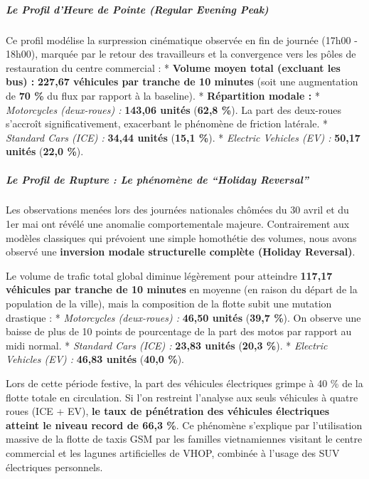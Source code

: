 \documentclass[11pt, a4paper]{article}
\begin{document}
\subparagraph{Le Profil d'Heure de Pointe (Regular Evening
Peak)}\label{le-profil-dheure-de-pointe-regular-evening-peak}

Ce profil modélise la surpression cinématique observée en fin de journée
(17h00 - 18h00), marquée par le retour des travailleurs et la
convergence vers les pôles de restauration du centre commercial : *
\textbf{Volume moyen total (excluant les bus) :} \textbf{227,67
véhicules par tranche de 10 minutes} (soit une augmentation de
\textbf{70 \%} du flux par rapport à la baseline). * \textbf{Répartition
modale :} * \emph{Motorcycles (deux-roues) :} \textbf{143,06 unités}
(\textbf{62,8 \%}). La part des deux-roues s'accroît significativement,
exacerbant le phénomène de friction latérale. * \emph{Standard Cars
(ICE) :} \textbf{34,44 unités} (\textbf{15,1 \%}). * \emph{Electric
Vehicles (EV) :} \textbf{50,17 unités} (\textbf{22,0 \%}).

\subparagraph{Le Profil de Rupture : Le phénomène de ``Holiday
Reversal''}\label{le-profil-de-rupture-le-phuxe9nomuxe8ne-de-holiday-reversal}

Les observations menées lors des journées nationales chômées du 30 avril
et du 1er mai ont révélé une anomalie comportementale majeure.
Contrairement aux modèles classiques qui prévoient une simple homothétie
des volumes, nous avons observé une \textbf{inversion modale
structurelle complète (Holiday Reversal)}.

Le volume de trafic total global diminue légèrement pour atteindre
\textbf{117,17 véhicules par tranche de 10 minutes} en moyenne (en
raison du départ de la population de la ville), mais la composition de
la flotte subit une mutation drastique : * \emph{Motorcycles
(deux-roues) :} \textbf{46,50 unités} (\textbf{39,7 \%}). On observe une
baisse de plus de 10 points de pourcentage de la part des motos par
rapport au midi normal. * \emph{Standard Cars (ICE) :} \textbf{23,83
unités} (\textbf{20,3 \%}). * \emph{Electric Vehicles (EV) :}
\textbf{46,83 unités} (\textbf{40,0 \%}).

Lors de cette période festive, la part des véhicules électriques grimpe
à 40 \% de la flotte totale en circulation. Si l'on restreint l'analyse
aux seuls véhicules à quatre roues (ICE + EV), \textbf{le taux de
pénétration des véhicules électriques atteint le niveau record de 66,3
\%}. Ce phénomène s'explique par l'utilisation massive de la flotte de
taxis GSM par les familles vietnamiennes visitant le centre commercial
et les lagunes artificielles de VHOP, combinée à l'usage des SUV
électriques personnels.
\end{document}
